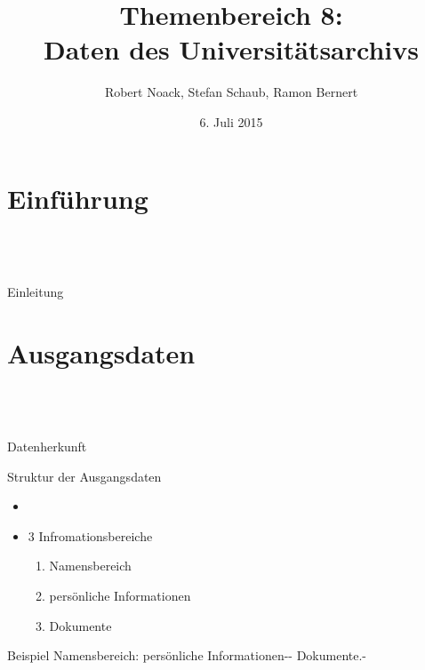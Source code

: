 \documentclass[12pt]{beamer}
\author{Robert Noack, Stefan Schaub, Ramon Bernert}
\title{\textbf{Themenbereich 8: \\Daten des Universitätsarchivs}}
\date{6. Juli 2015}
\begin{document}
\begin{large}
\section*{}
\begin{frame}
\titlepage
\end{frame}

\begin{frame}
\tableofcontents
\end{frame}

\section{Einführung}
 \subsection*{~}
\begin{frame}{Einleitung}

\end{frame}

\begin{frame}

\end{frame}

\section{Ausgangsdaten}
 \subsection*{~}
\begin{frame}{Datenherkunft}

\end{frame}

\begin{frame}{Struktur der Ausgangsdaten}
\begin{itemize}
\item 
\item 3 Infromationsbereiche
 \begin{enumerate}
  \item Namensbereich
  \item persönliche Informationen
  \item Dokumente
 \end{enumerate}
\end{itemize}

 
 \vspace*{\fill}
 \begin{block}{Beispiel}
 \normalsize Namensbereich: persönliche Informationen-{}- Dokumente.-
 \end{block}
\end{frame} 


\end{large}
\end{document}
